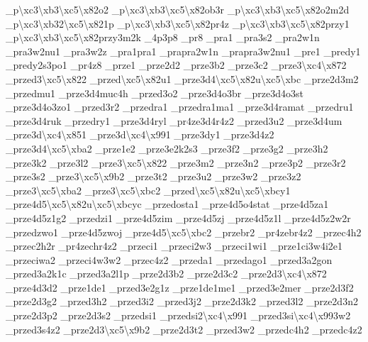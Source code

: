 {\-\_\-p\textbackslash{}xc3\textbackslash{}xb3\textbackslash{}xc5\textbackslash{}x82o2 \-\_\-p\textbackslash{}xc3\textbackslash{}xb3\textbackslash{}xc5\textbackslash{}x82ob3r \-\_\-p\textbackslash{}xc3\textbackslash{}xb3\textbackslash{}xc5\textbackslash{}x82o2m2d \-\_\-p\textbackslash{}xc3\textbackslash{}xb32\textbackslash{}xc5\textbackslash{}x821p \-\_\-p\textbackslash{}xc3\textbackslash{}xb3\textbackslash{}xc5\textbackslash{}x82pr4z \-\_\-p\textbackslash{}xc3\textbackslash{}xb3\textbackslash{}xc5\textbackslash{}x82przy1 \-\_\-p\textbackslash{}xc3\textbackslash{}xb3\textbackslash{}xc5\textbackslash{}x82przy3m2k \-\_\-4p3p8 \-\_\-pr8 \-\_\-pra1 \-\_\-pra3s2 \-\_\-pra2w1n \-\_\-pra3w2nu1 \-\_\-pra3w2z \-\_\-pra1pra1 \-\_\-prapra2w1n \-\_\-prapra3w2nu1 \-\_\-pre1 \-\_\-predy1 \-\_\-predy2s3po1 \-\_\-pr4z8 \-\_\-prze1 \-\_\-prze2d2 \-\_\-prze3b2 \-\_\-prze3c2 \-\_\-prze3\textbackslash{}xc4\textbackslash{}x872 \-\_\-przed3\textbackslash{}xc5\textbackslash{}x822 \-\_\-przed\textbackslash{}xc5\textbackslash{}x82u1 \-\_\-prze3d4\textbackslash{}xc5\textbackslash{}x82u\textbackslash{}xc5\textbackslash{}xbc \-\_\-prze2d3m2 \-\_\-przedmu1 \-\_\-prze3d4muc4h \-\_\-przed3o2 \-\_\-prze3d4o3br \-\_\-prze3d4o3st \-\_\-prze3d4o3zo1 \-\_\-przed3r2 \-\_\-przedra1 \-\_\-przedra1ma1 \-\_\-prze3d4ramat \-\_\-przedru1 \-\_\-prze3d4ruk \-\_\-przedry1 \-\_\-prze3d4ryl \-\_\-pr4ze3d4r4z2 \-\_\-przed3u2 \-\_\-prze3d4um \-\_\-prze3d\textbackslash{}xc4\textbackslash{}x851 \-\_\-prze3d\textbackslash{}xc4\textbackslash{}x991 \-\_\-prze3dy1 \-\_\-prze3d4z2 \-\_\-prze3d4\textbackslash{}xc5\textbackslash{}xba2 \-\_\-prze1e2 \-\_\-prze3e2k2s3 \-\_\-prze3f2 \-\_\-prze3g2 \-\_\-prze3h2 \-\_\-prze3k2 \-\_\-prze3l2 \-\_\-prze3\textbackslash{}xc5\textbackslash{}x822 \-\_\-prze3m2 \-\_\-prze3n2 \-\_\-prze3p2 \-\_\-prze3r2 \-\_\-prze3s2 \-\_\-prze3\textbackslash{}xc5\textbackslash{}x9b2 \-\_\-prze3t2 \-\_\-prze3u2 \-\_\-prze3w2 \-\_\-prze3z2 \-\_\-prze3\textbackslash{}xc5\textbackslash{}xba2 \-\_\-prze3\textbackslash{}xc5\textbackslash{}xbc2 \-\_\-przed\textbackslash{}xc5\textbackslash{}x82u\textbackslash{}xc5\textbackslash{}xbcy1 \-\_\-prze4d5\textbackslash{}xc5\textbackslash{}x82u\textbackslash{}xc5\textbackslash{}xbcyc \-\_\-przedosta1 \-\_\-prze4d5o4stat \-\_\-prze4d5za1 \-\_\-prze4d5z1g2 \-\_\-przedzi1 \-\_\-prze4d5zim \-\_\-prze4d5zj \-\_\-prze4d5z1l \-\_\-prze4d5z2w2r \-\_\-przedzwo1 \-\_\-prze4d5zwoj \-\_\-prze4d5\textbackslash{}xc5\textbackslash{}xbc2 \-\_\-przebr2 \-\_\-pr4zebr4z2 \-\_\-przec4h2 \-\_\-przec2h2r \-\_\-pr4zechr4z2 \-\_\-przeci1 \-\_\-przeci2w3 \-\_\-przeci1wi1 \-\_\-prze1ci3w4i2e1 \-\_\-przeciwa2 \-\_\-przeci4w3w2 \-\_\-przec4z2 \-\_\-przeda1 \-\_\-przedago1 \-\_\-przed3a2gon \-\_\-przed3a2k1c \-\_\-przed3a2l1p \-\_\-prze2d3b2 \-\_\-prze2d3c2 \-\_\-prze2d3\textbackslash{}xc4\textbackslash{}x872 \-\_\-prze4d3d2 \-\_\-prze1de1 \-\_\-przed3e2g1z \-\_\-prze1de1me1 \-\_\-przed3e2mer \-\_\-prze2d3f2 \-\_\-prze2d3g2 \-\_\-przed3h2 \-\_\-przed3i2 \-\_\-przed3j2 \-\_\-prze2d3k2 \-\_\-przed3l2 \-\_\-prze2d3n2 \-\_\-prze2d3p2 \-\_\-prze2d3s2 \-\_\-przedsi1 \-\_\-przedsi2\textbackslash{}xc4\textbackslash{}x991 \-\_\-przed3si\textbackslash{}xc4\textbackslash{}x993w2 \-\_\-przed3s4z2 \-\_\-prze2d3\textbackslash{}xc5\textbackslash{}x9b2 \-\_\-prze2d3t2 \-\_\-przed3w2 \-\_\-przedc4h2 \-\_\-przedc4z2 }
